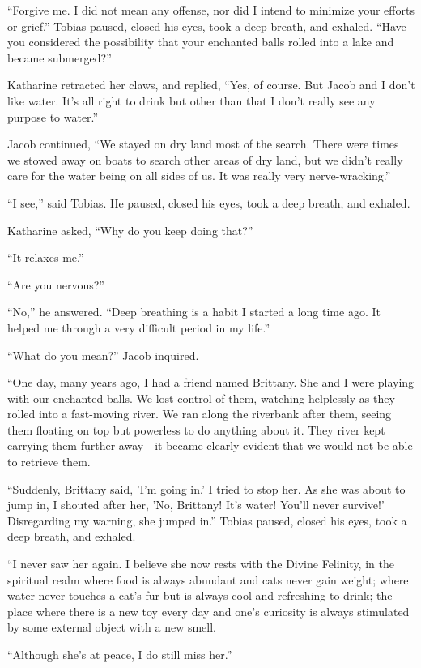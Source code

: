 “Forgive me. I did not mean any offense, nor did I intend to minimize your efforts or grief.” Tobias paused, closed his eyes, took a deep breath, and exhaled. “Have you considered the possibility that your enchanted balls rolled into a lake and became submerged?”

Katharine retracted her claws, and replied, “Yes, of course. But Jacob and I don't like water. It's all right to drink but other than that I don't really see any purpose to water.”

Jacob continued, “We stayed on dry land most of the search. There were times we stowed away on boats to search other areas of dry land, but we didn't really care for the water being on all sides of us. It was really very nerve-wracking.”

“I see,” said Tobias. He paused, closed his eyes, took a deep breath, and exhaled.

Katharine asked, “Why do you keep doing that?”

“It relaxes me.”

“Are you nervous?”

“No,” he answered. “Deep breathing is a habit I started a long time ago. It helped me through a very difficult period in my life.”

“What do you mean?” Jacob inquired.

“One day, many years ago, I had a friend named Brittany. She and I were playing with our enchanted balls. We lost control of them, watching helplessly as they rolled into a fast-moving river. We ran along the riverbank after them, seeing them floating on top but powerless to do anything about it. They river kept carrying them further away—it became clearly evident that we would not be able to retrieve them.

“Suddenly, Brittany said, 'I'm going in.' I tried to stop her. As she was about to jump in, I shouted after her, 'No, Brittany! It's water! You'll never survive!' Disregarding my warning, she jumped in.” Tobias paused, closed his eyes, took a deep breath, and exhaled.

“I never saw her again. I believe she now rests with the Divine Felinity, in the spiritual realm where food is always abundant and cats never gain weight; where water never touches a cat's fur but is always cool and refreshing to drink; the place where there is a new toy every day and one's curiosity is always stimulated by some external object with a new smell.

“Although she's at peace, I do still miss her.”

